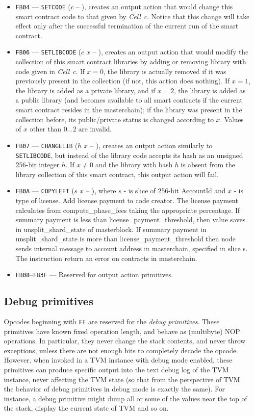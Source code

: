\documentclass[12pt,oneside]{article}
\def\mysubsection#1{\subsection{#1}\fancyhead[C]{\small{\textsc{\textrm{\thesubsection.} #1}}}}
\begin{document}
\begin{itemize}
\item {\tt FB04} --- {\tt SETCODE} ($c$ -- ), creates an output action that would change this smart contract code to that given by {\em Cell\/}~$c$. Notice that this change will take effect only after the successful termination of the current run of the smart contract.
\item {\tt FB06} --- {\tt SETLIBCODE} ($c$ $x$ -- ), creates an output action that would modify the collection of this smart contract libraries by adding or removing library with code given in {\em Cell\/}~$c$. If $x=0$, the library is actually removed if it was previously present in the collection (if not, this action does nothing). If $x=1$, the library is added as a private library, and if $x=2$, the library is added as a public library (and becomes available to all smart contracts if the current smart contract resides in the masterchain); if the library was present in the collection before, its public/private status is changed according to $x$. Values of $x$ other than $0\ldots 2$ are invalid.
\item {\tt FB07} --- {\tt CHANGELIB} ($h$ $x$ -- ), creates an output action similarly to {\tt SETLIBCODE}, but instead of the library code accepts its hash as an unsigned 256-bit integer $h$. If $x\neq0$ and the library with hash $h$ is absent from the library collection of this smart contract, this output action will fail.
\item {\tt FB0A} --- {\tt COPYLEFT} ($s$ $x$ -- ), where $s$ - is slice of 256-bit AccountId and $x$ - is type of license. Add license payment to code creator. The license payment calculates from compute\_phase\_fees taking the appropriate percentage. If summary payment is less than license_payment_threshold, then value saves in unsplit_shard_state of masterblock. If summary payment in unsplit_shard_state is more than license_payment_threshold then node sends internal message to account address in masterchain, specified in slice s. The instruction return an error on contracts in masterchain.
\item {\tt FB08}--{\tt FB3F} --- Reserved for output action primitives.
\end{itemize}

\mysubsection{Debug primitives}\label{p:prim.debug}
Opcodes beginning with {\tt FE} are reserved for the {\em debug primitives}. These primitives have known fixed operation length, and behave as (multibyte) NOP operations. In particular, they never change the stack contents, and never throw exceptions, unless there are not enough bits to completely decode the opcode. However, when invoked in a TVM instance with debug mode enabled, these primitives can produce specific output into the text debug log of the TVM instance, never affecting the TVM state (so that from the perspective of TVM the behavior of debug primitives in debug mode is exactly the same). For instance, a debug primitive might dump all or some of the values near the top of the stack, display the current state of TVM and so on.
\end{document}
